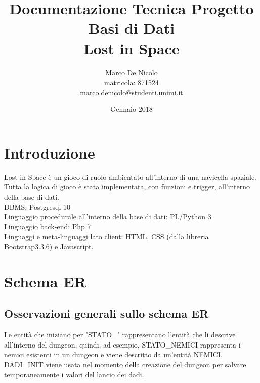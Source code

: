 \documentclass[11pt]{article}
\title{Documentazione Tecnica Progetto Basi di Dati\\Lost in Space}
\author{Marco De Nicolo\\ matricola: 871524\\ \url{marco.denicolo@studenti.unimi.it}}
\date{Gennaio 2018}
\begin{document}
\maketitle
\newpage
\section{Introduzione}
Lost in Space è un gioco di ruolo ambientato all'interno di una navicella spaziale.\\
Tutta la logica di gioco è stata implementata, con funzioni e trigger, all'interno della base di dati.\\
DBMS: Postgresql 10\\
Linguaggio procedurale all'interno della base di dati: PL/Python 3\\
Linguaggio back-end: Php 7\\
Linguaggi e meta-linguaggi lato client: HTML, CSS (dalla libreria Bootstrap3.3.6) e Javascript.\\
\section{Schema ER}
\begin{figure}[htp] 
\end{figure}
\subsection{Osservazioni generali sullo schema ER}
Le entità che iniziano per "STATO\_" rappresentano l'entità che li descrive all'interno del dungeon, quindi, ad esempio, STATO\_NEMICI rappresenta i nemici esistenti in un dungeon e viene descritto da un'entità NEMICI.\\
DADI\_INIT viene usata nel momento della creazione del dungeon per salvare temporaneamente i valori del lancio dei dadi.\\
\end{document}
